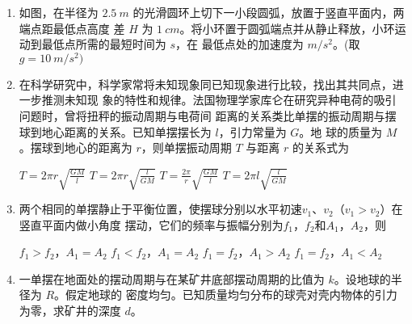 

\begin{enumerate}
	\item
{}
如图，在半径为 $ 2.5 \ m $ 的光滑圆环上切下一小段圆弧，放置于竖直平面内，两端点距最低点高度
差 $ H $ 为 $ 1 \ cm $。将小环置于圆弧端点并从静止释放，小环运动到最低点所需的最短时间为 \underlinegap $ s $，在
最低点处的加速度为 \underlinegap 
$ m/s^{2} $。(取 $ g=10 \ m/s^{2} ) $
\begin{figure}[h!]
	\centering
	
\end{figure}


\item 
{}
在科学研究中，科学家常将未知现象同已知现象进行比较，找出其共同点，进一步推测未知现
象的特性和规律。法国物理学家库仑在研究异种电荷的吸引问题时，曾将扭秤的振动周期与电荷间
距离的关系类比单摆的振动周期与摆球到地心距离的关系。已知单摆摆长为 $ l $，引力常量为 $ G $。地
球的质量为 $ M $。摆球到地心的距离为 $ r $，则单摆振动周期 $ T $ 与距离 $ r $ 的关系式为  

\fourchoices
{$T=2 \pi r \sqrt{\frac{G M}{l}}$}
{$T=2 \pi r \sqrt{\frac{l}{G M}}$}
{$T=\frac{2 \pi}{r} \sqrt{\frac{G M}{l}}$}
{$T=2 \pi l \sqrt{\frac{l}{G M}}$}



\item 
{}
两个相同的单摆静止于平衡位置，使摆球分别以水平初速$ v_{1} $、$ v_{2} $（$ v_{1} > v_{2} $）在竖直平面内做小角度
摆动，它们的频率与振幅分别为$ f_{1} $，$ f_{2} $和$ A_{1} $，$ A_{2} $，则  

\fourchoices
{$ f_{1} > f_{2} $，$ A_{1} = A_{2} $}
{$ f_{1} < f_{2} $，$ A_{1} = A_{2} $}
{$ f_{1} = f_{2} $，$ A_{1} > A_{2} $}
{$ f_{1} = f_{2} $，$ A_{1} < A_{2} $}



\item 
{}
一单摆在地面处的摆动周期与在某矿井底部摆动周期的比值为 $ k $。设地球的半径为 $ R $。假定地球的
密度均匀。已知质量均匀分布的球壳对壳内物体的引力为零，求矿井的深度 $ d $。






	
	
	
\end{enumerate}

